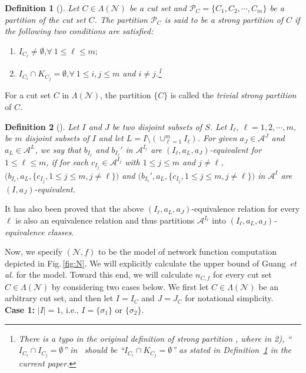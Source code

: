 \documentclass[11pt,draftclsnofoot,onecolumn]{IEEEtran}
\newtheorem{definition}{Definition}
\begin{document}
\begin{definition}[\!]\label{def:strong_partition}
	Let $C\in\Lambda(\mathcal{N})$ be a cut set and $\mathcal{P}_{C} =\{C_{1}, C_{2},\cdots,C_{m}\}$
	be a partition of the cut set $C$. The partition $\mathcal{P}_{C}$ is said to be a strong
	partition of $C$ if the following two conditions are satisfied:
	\begin{enumerate}
		\item $I_{C_{\ell}}\neq\emptyset$,\quad $\forall~ 1\leq \ell\leq m;$
		\item $I_{C_{i}}\cap K_{C_{j}}=\emptyset$,\quad$\forall~ 1\leq i,j\leq m $ and $i\neq j$.\footnote{There is a typo in the original definition of strong partition {\cite[Definition~2]{Guang_Improved_upper_bound}}, where in 2), ``$I_{C_i}\cap I_{C_j}=\emptyset$'' in~{\cite[Definition~2]{Guang_Improved_upper_bound}} should be ``$I_{C_{i}}\cap K_{C_{j}}=\emptyset$'' as stated in Definition~\ref{def:strong_partition} in the current paper.}
		\end{enumerate}
\end{definition}

For a cut set $C$ in $\Lambda(\mathcal{N})$,  the partition $\{C\}$ is called the
\emph{trivial strong partition} of $C$.

\begin{definition}[\!]\label{def:I_a_L_a_j_equiv}
	Let $I$ and $J$ be two disjoint subsets of $S$. Let
	$I_{\ell},~\ell= 1, 2,\cdots, m,$ be $m$ disjoint subsets of $I$ and let $L = I\setminus(\cup_{\ell=1}^{m}I_{\ell})$. For given $a_{J}\in\mathcal{A}^{J}$ and $a_{L}\in\mathcal{A}^{L}$, we say that
	$b_{I_{\ell}}$	 and $b_{I_{\ell}}'$	 in $\mathcal{A}^{I_{\ell}}$	 are $(I_{\ell}, a_{L}, a_{J} )$-equivalent for $1\leq \ell\leq m$,
	if for each $c_{I_{j}}\in\mathcal{A}^{I_{j}} $ with $1\leq j\leq m$ and $j\neq \ell$,
		$\big(b_{I_{\ell}},a_{L},\{c_{I_{j}},1\leq j\leq m, j\neq \ell\}\big)$
and
	$	\big(b_{I_{\ell}}',a_{L},\{c_{I_{j}},1\leq j\leq m, j\neq \ell\}\big)$ in $\mathcal{A}^{I}$
		are $(I, a_{J})$-equivalent.
	\end{definition}

It has also been proved that  the above $(I_{\ell}, a_{L}, a_{J} )$-equivalence relation for every $\ell$ is also an equivalence
relation and thus partitions $\mathcal{A}^{I_{\ell}}$
into \emph{$(I_{\ell}
, a_{L}, a_{J})$-equivalence
classes}.

Now, we specify $(\mathcal{N},f)$ to be the model of network function computation depicted in Fig.\,\ref{fig:N}. We will explicitly calculate the upper bound of Guang~\emph{et al.} for the model. Toward this end, we will calculate $n_{C,f}$ for every cut set $C\in\Lambda(\mathcal{N})$ by considering two cases below. We first let $C\in\Lambda(\mathcal{N})$
be an arbitrary cut set, and then  let $I=I_{C}$ and $J=J_{C}$ for notational simplicity.\\
\textbf{Case 1:} $|I|=1$, i.e., $I=\{\sigma_{1}\}$ or $\{\sigma_{2}\}$.
\end{document}
